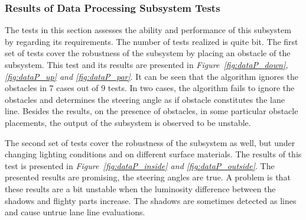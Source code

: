 \documentclass[a4paper,12pt]{article}
\begin{document}
		
	
	
		
	
		
		
		
	\subsubsection*{Results of Data Processing Subsystem Tests}\label{sec:DataProcessingSubsystemTests}
	The tests in this section assesses the ability and performance of this subsystem by regarding its requirements. The number of tests realized is quite  bit. The first set of tests cover the robustness of the subsystem by placing an obstacle of the subsystem. This test and its results are presented in \textit{Figure~\ref{fig:dataP_down},\ref{fig:dataP_up} and \ref{fig:dataP_par}}. It can be seen that the algorithm ignores the obstacles in 7 cases out of 9 tests. In two cases, the algorithm fails to ignore the obstacles and determines the steering angle as if obstacle constitutes the lane line. Besides the results, on the presence of obstacles, in some particular obstacle placements, the output of the subsystem is observed to be unstable.
	
	The second set of tests cover the robustness of the subsystem as well, but under changing lighting conditions and on different surface materials. The results of this test is presented in \textit{Figure~\ref{fig:dataP_inside} and \ref{fig:dataP_outside}}. The presented results are promising, the steering angles are true. A problem is that these results are a bit unstable when the luminosity difference between the shadows and flighty parts increase. The shadows are sometimes detected as lines and cause untrue lane line evaluations.	
	
\end{document}
